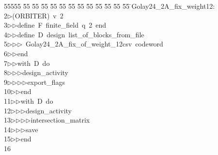 %
%
\begin{tabbing}
55555 \= 55 \= 55 \= 55 \= 55 \= 55 \= 55 \= 55 \= 55 \= 55 \= 55 \= 55 \= 55 \= \>Golay24\_2A\_fix\_weight12:\\[0pt]
2\>$\triangleright$\>(ORBITER)\ v\ 2\ \\[0pt]
3\>$\triangleright$\>$\triangleright$\>define\ F\ finite\_field\ q\ 2\ end\ \\[0pt]
4\>$\triangleright$\>$\triangleright$\>define\ D\ design\ list\_of\_blocks\_from\_file\ \\[0pt]
5\>$\triangleright$\>$\triangleright$\>$\triangleright$\ Golay24\_2A\_fix\_of\_weight\_12csv\ codeword\ \\[0pt]
6\>$\triangleright$\>$\triangleright$\>end\ \\[0pt]
7\>$\triangleright$\>$\triangleright$\>with\ D\ do\ \\[0pt]
8\>$\triangleright$\>$\triangleright$\>$\triangleright$\>design\_activity\ \\[0pt]
9\>$\triangleright$\>$\triangleright$\>$\triangleright$\>$\triangleright$\>export\_flags\ \\[0pt]
10\>$\triangleright$\>$\triangleright$\>end\ \\[0pt]
11\>$\triangleright$\>$\triangleright$\>with\ D\ do\ \\[0pt]
12\>$\triangleright$\>$\triangleright$\>$\triangleright$\>design\_activity\ \\[0pt]
13\>$\triangleright$\>$\triangleright$\>$\triangleright$\>$\triangleright$\>intersection\_matrix\ \\[0pt]
14\>$\triangleright$\>$\triangleright$\>$\triangleright$\>save\ \\[0pt]
15\>$\triangleright$\>$\triangleright$\>end\\[0pt]
16\>\end{tabbing}
